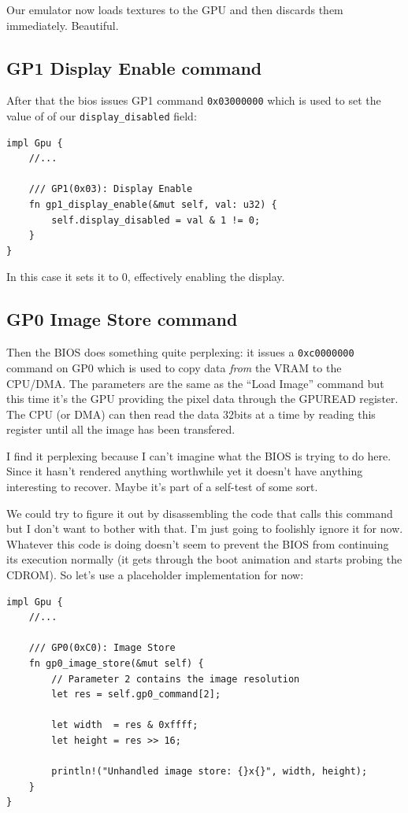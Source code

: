 \documentclass[a4paper]{article}
\newcommand{\code}[1] {\texttt{#1}}
\begin{document}
Our emulator now loads textures to the GPU and then discards them
immediately. Beautiful.

\subsection{GP1 Display Enable command}

After that the bios issues GP1 command \code{0x03000000} which is used
to set the value of of our \code{display\_disabled} field:

\begin{lstlisting}
impl Gpu {
    //...

    /// GP1(0x03): Display Enable
    fn gp1_display_enable(&mut self, val: u32) {
        self.display_disabled = val & 1 != 0;
    }
}
\end{lstlisting}

In this case it sets it to 0, effectively enabling the display.

\subsection{GP0 Image Store command}

Then the BIOS does something quite perplexing: it issues a
\code{0xc0000000} command on GP0 which is used to copy data
\emph{from} the VRAM to the CPU/DMA. The parameters are the same as
the ``Load Image'' command but this time it's the GPU providing the
pixel data through the GPUREAD register. The CPU (or DMA) can then
read the data 32bits at a time by reading this register until all the
image has been transfered.

I find it perplexing because I can't imagine what the BIOS is trying
to do here. Since it hasn't rendered anything worthwhile yet it
doesn't have anything interesting to recover. Maybe it's part of a
self-test of some sort.

We could try to figure it out by disassembling the code that calls
this command but I don't want to bother with that. I'm just going to
foolishly ignore it for now. Whatever this code is doing doesn't seem
to prevent the BIOS from continuing its execution normally (it gets
through the boot animation and starts probing the CDROM). So let's use
a placeholder implementation for now:

\begin{lstlisting}
impl Gpu {
    //...

    /// GP0(0xC0): Image Store
    fn gp0_image_store(&mut self) {
        // Parameter 2 contains the image resolution
        let res = self.gp0_command[2];

        let width  = res & 0xffff;
        let height = res >> 16;

        println!("Unhandled image store: {}x{}", width, height);
    }
}
\end{lstlisting}
\end{document}
